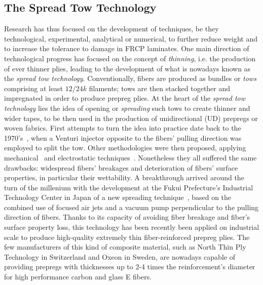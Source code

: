 \documentclass[a4paper]{jpconf}
\begin{document}
\subsection{The Spread Tow Technology}
Research has thus focused on the development of techniques, be they technological, experimental, analytical or numerical, to further reduce weight and to increase the tolerance to damage in FRCP laminates. One main direction of technological progress has focused on the concept of \textit{thinning}, i.e. the production of ever thinner plies, leading to the development of what is nowadays known as the \textit{spread tow technology}. Conventionally, fibers are produced as bundles or \textit{tows} comprising at least $12/24k$ filaments; tows are then stacked together and impregnated in order to produce prepreg plies. At the heart of the \textit{spread tow technology} lies the idea of opening or \textit{spreading} such tows to create thinner and wider tapes, to be then used in the production of unidirectional (UD) prepregs or woven fabrics. First attempts to turn the idea into practice date back to the 1970's~\cite{spreadtowpatent:1974}, when a Venturi injector opposite to the fibers' pulling direction was employed to split the tow. Other methodologies were then proposed, applying mechanical~\cite{spreadtowpatent:1991,spreadtowpatent:1992,spreadtowpatent:2000} and electrostatic techniques~\cite{spreadtowpatent:1993}. Nonetheless they all suffered the same drawbacks: widespread fibers' breakages and deterioration of fibers' surface properties, in particular their wettability. A breakthrough arrived around the turn of the millenium with the development at the Fukui Prefecture's Industrial Technology Center in Japan of a new spreading technique~\cite{KawabeTomodaMatsuo:1997,spreadtowpatent:2003,Kawabe:2008,SasayamaTomoda:2009}, based on the combined use of focused air jets and a vacuum pump perpendicular to the pulling direction of fibers. Thanks to its capacity of avoiding fiber breakage and fiber's surface property loss, this technology has been recently been applied on industrial scale to produce high-quality extremely thin fiber-reinforced prepreg plies. The few manufacturers of this kind of composite material, such as North Thin Ply Technology \cite{ntpt} in Switzerland and Oxeon \cite{oxeon} in Sweden, are nowadays capable of providing prepregs with thicknesses up to 2-4 times the reinforcement's diameter for high performance carbon and glass E fibers.
\end{document}
